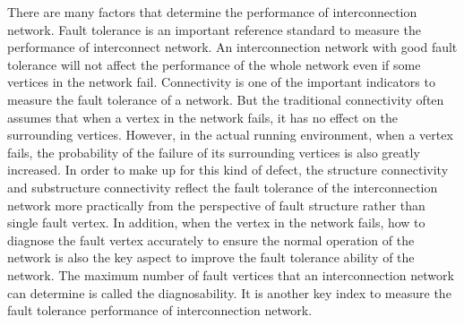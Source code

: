 \begin{englishabstract}


There are many factors that determine the performance of interconnection network. Fault tolerance is an important reference standard to measure the performance of interconnect network. An interconnection network with good fault tolerance will not affect the performance of the whole network even if some vertices in the network fail. Connectivity is one of the important indicators to measure the fault tolerance of a network. But the traditional connectivity often assumes that when a vertex in the network fails, it has no effect on the surrounding vertices. However, in the actual running environment, when a vertex fails, the probability of the failure of its surrounding vertices is also greatly increased. In order to make up for this kind of defect, the structure connectivity and substructure connectivity reflect the fault tolerance of the interconnection network more practically from the perspective of fault structure rather than single fault vertex. In addition, when the vertex in the network fails, how to diagnose the fault vertex accurately to ensure the normal operation of the network is also the key aspect to improve the fault tolerance ability of the network. The maximum number of fault vertices that an interconnection network can determine is called the diagnosability. It is another key index to measure the fault tolerance performance of interconnection network.



\end{englishabstract}
